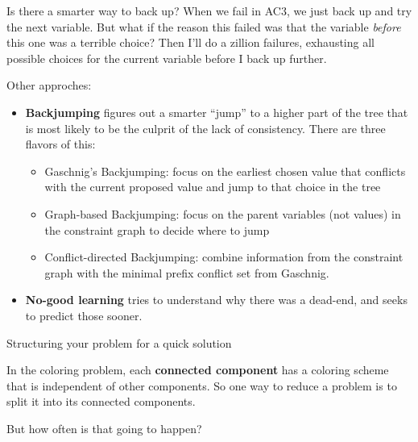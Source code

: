 \documentclass{beamer}
\begin{document}
\begin{frame}{Is there a smarter way to back up?}
    When we fail in AC3, we just back up and try the next variable. But what if the reason
    this failed was that the variable {\em before} this one was a terrible choice? Then I'll do a zillion failures, exhausting all possible choices for the current variable before I back up further.

    \vspace{0.1in}
    Other approches:
    \begin{itemize}
        \item {\bf Backjumping} figures out a smarter ``jump'' to a higher part of the tree that is most likely to be the culprit of the lack of consistency. There are three flavors of this:
        \begin{itemize}
            \item Gaschnig's Backjumping: focus on the earliest chosen value that conflicts with the current proposed value and jump to that choice in the tree
            \item Graph-based Backjumping: focus on the parent variables (not values) in 
            the constraint graph to decide where to jump
            \item Conflict-directed Backjumping: combine information from the constraint 
            graph with the minimal prefix conflict set from Gaschnig.
        \end{itemize}

        \item {\bf No-good learning} tries to understand why there was a dead-end, and 
        seeks to predict those sooner.
    \end{itemize}
    
\end{frame}

\begin{frame}{Structuring your problem for a quick solution}

    In the coloring problem, each {\bf connected component} has a coloring scheme
    that is independent of other components. So one way to reduce a problem is to split it into its connected components.

    \vspace{.1in}

    But how often is that going to happen?
    
\end{frame}
\end{document}
